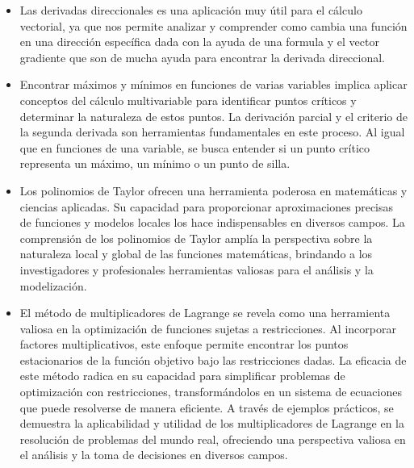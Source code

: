 \begin{itemize}
  \item Las derivadas direccionales es una aplicación muy útil para el cálculo vectorial, ya que nos permite analizar y comprender como cambia una función en una dirección específica dada con la ayuda de una formula y el vector gradiente que son de mucha ayuda para encontrar la derivada direccional.  
  
  \item Encontrar máximos y mínimos en funciones de varias variables implica aplicar conceptos del cálculo multivariable para identificar puntos críticos y determinar la naturaleza de estos puntos. La derivación parcial y el criterio de la segunda derivada son herramientas fundamentales en este proceso. Al igual que en funciones de una variable, se busca entender si un punto crítico representa un máximo, un mínimo o un punto de silla. 
  
  \item Los polinomios de Taylor ofrecen una herramienta poderosa en matemáticas y ciencias aplicadas. Su capacidad para proporcionar aproximaciones precisas de funciones y modelos locales los hace indispensables en diversos campos. La comprensión de los polinomios de Taylor amplía la perspectiva sobre la naturaleza local y global de las funciones matemáticas, brindando a los investigadores y profesionales herramientas valiosas para el análisis y la modelización.
  
  \item El método de multiplicadores de Lagrange se revela como una herramienta valiosa en la optimización de funciones sujetas a restricciones. Al incorporar factores multiplicativos, este enfoque permite encontrar los puntos estacionarios de la función objetivo bajo las restricciones dadas. La eficacia de este método radica en su capacidad para simplificar problemas de optimización con restricciones, transformándolos en un sistema de ecuaciones que puede resolverse de manera eficiente. A través de ejemplos prácticos, se demuestra la aplicabilidad y utilidad de los multiplicadores de Lagrange en la resolución de problemas del mundo real, ofreciendo una perspectiva valiosa en el análisis y la toma de decisiones en diversos campos.
\end{itemize}





